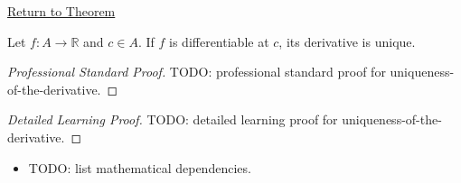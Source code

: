 \newpage
{}
\label{prf:uniqueness-of-the-derivative}

\begin{remark*}[Return]
\hyperref[thm:uniqueness-of-the-derivative]{Return to Theorem}
\end{remark*}

\begin{theorem*}
Let $f : A \to \mathbb{R}$ and $c \in A$. If $f$ is differentiable at $c$, its derivative is unique.

\smallskip\noindent
\end{theorem*}

\begin{proof}[Professional Standard Proof]
\LRAProofBodyStart
TODO: professional standard proof for uniqueness-of-the-derivative.
\end{proof}

\begin{proof}[Detailed Learning Proof]
\LRAProofBodyStart
TODO: detailed learning proof for uniqueness-of-the-derivative.
\end{proof}

\begin{remark*}
\end{remark*}

\begin{dependencies}
\begin{itemize}
  \item TODO: list mathematical dependencies.
\end{itemize}
\end{dependencies}

\clearpage
